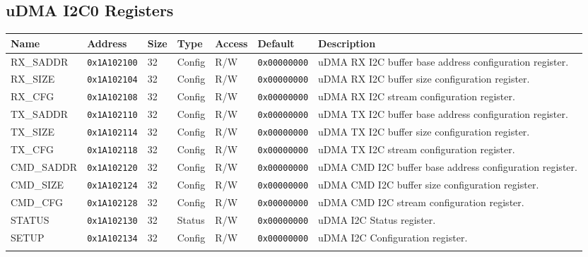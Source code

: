 
\subsection{uDMA I2C0 Registers}
{\small
\begin{tabularx}{\textwidth}{|l|l|l|l|l|l|X|}
  \hline
  \textbf{Name} & \textbf{Address}  & \textbf{Size} & \textbf{Type} & \textbf{Access} & \textbf{Default} & \textbf{Description} \\
  \hline
  RX\_SADDR & \texttt{0x1A102100} & 32 & Config & R/W & \texttt{0x00000000} & uDMA RX I2C buffer base address configuration register.\\
  \hline
  RX\_SIZE & \texttt{0x1A102104} & 32 & Config & R/W & \texttt{0x00000000} & uDMA RX I2C buffer size configuration register.\\
  \hline
  RX\_CFG & \texttt{0x1A102108} & 32 & Config & R/W & \texttt{0x00000000} & uDMA RX I2C stream configuration register.\\
  \hline
  TX\_SADDR & \texttt{0x1A102110} & 32 & Config & R/W & \texttt{0x00000000} & uDMA TX I2C buffer base address configuration register.\\
  \hline
  TX\_SIZE & \texttt{0x1A102114} & 32 & Config & R/W & \texttt{0x00000000} & uDMA TX I2C buffer size configuration register.\\
  \hline
  TX\_CFG & \texttt{0x1A102118} & 32 & Config & R/W & \texttt{0x00000000} & uDMA TX I2C stream configuration register.\\
  \hline
  CMD\_SADDR & \texttt{0x1A102120} & 32 & Config & R/W & \texttt{0x00000000} & uDMA CMD I2C buffer base address configuration register.\\
  \hline
  CMD\_SIZE & \texttt{0x1A102124} & 32 & Config & R/W & \texttt{0x00000000} & uDMA CMD I2C buffer size configuration register.\\
  \hline
  CMD\_CFG & \texttt{0x1A102128} & 32 & Config & R/W & \texttt{0x00000000} & uDMA CMD I2C stream configuration register.\\
  \hline
  STATUS & \texttt{0x1A102130} & 32 & Status & R/W & \texttt{0x00000000} & uDMA I2C Status register.\\
  \hline
  SETUP & \texttt{0x1A102134} & 32 & Config & R/W & \texttt{0x00000000} & uDMA I2C Configuration register.\\
  \hline
  \caption{uDMA I2C0}
\end{tabularx}
}




